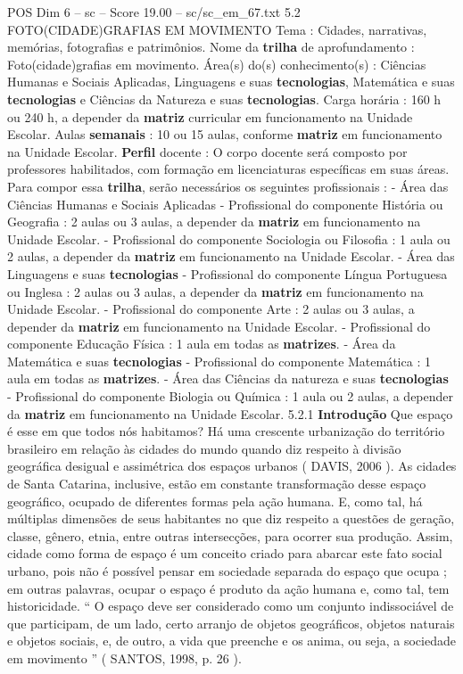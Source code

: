 \begin{textsample}{POS Dim 6 – sc – Score 19.00 – sc/sc\_em\_67.txt}  \label{ex:f6_pos_019}
5.2 FOTO(CIDADE)GRAFIAS EM MOVIMENTO Tema : Cidades, narrativas, memórias, fotografias e patrimônios.
Nome da \textbf{trilha} de aprofundamento : Foto(cidade)grafias em movimento.
Área(s) do(s) conhecimento(s) : Ciências Humanas e Sociais Aplicadas, Linguagens e suas \textbf{tecnologias}, Matemática e suas \textbf{tecnologias} e Ciências da Natureza e suas \textbf{tecnologias}.
Carga horária : 160 h ou 240 h, a depender da \textbf{matriz} curricular em funcionamento na Unidade Escolar.
Aulas \textbf{semanais} : 10 ou 15 aulas, conforme \textbf{matriz} em funcionamento na Unidade Escolar. \textbf{Perfil} docente : O corpo docente será composto por professores habilitados, com formação em licenciaturas específicas em suas áreas.
Para compor essa \textbf{trilha}, serão necessários os seguintes profissionais : - Área das Ciências Humanas e Sociais Aplicadas - Profissional do componente História ou Geografia : 2 aulas ou 3 aulas, a depender da \textbf{matriz} em funcionamento na Unidade Escolar. - Profissional do componente Sociologia ou Filosofia : 1 aula ou 2 aulas, a depender da \textbf{matriz} em funcionamento na Unidade Escolar. - Área das Linguagens e suas \textbf{tecnologias} - Profissional do componente Língua Portuguesa ou Inglesa : 2 aulas ou 3 aulas, a depender da \textbf{matriz} em funcionamento na Unidade Escolar. - Profissional do componente Arte : 2 aulas ou 3 aulas, a depender da \textbf{matriz} em funcionamento na Unidade Escolar. - Profissional do componente Educação Física : 1 aula em todas as \textbf{matrizes}. - Área da Matemática e suas \textbf{tecnologias} - Profissional do componente Matemática : 1 aula em todas as \textbf{matrizes}. - Área das Ciências da natureza e suas \textbf{tecnologias} - Profissional do componente Biologia ou Química : 1 aula ou 2 aulas, a depender da \textbf{matriz} em funcionamento na Unidade Escolar. 5.2.1 \textbf{Introdução} Que espaço é esse em que todos nós habitamos?
Há uma crescente urbanização do território brasileiro em relação às cidades do mundo quando diz respeito à divisão geográfica desigual e assimétrica dos espaços urbanos ( DAVIS, 2006 ).
As cidades de Santa Catarina, inclusive, estão em constante transformação desse espaço geográfico, ocupado de diferentes formas pela ação humana.
E, como tal, há múltiplas dimensões de seus habitantes no que diz respeito a questões de geração, classe, gênero, etnia, entre outras intersecções, para ocorrer sua produção.
Assim, cidade como forma de espaço é um conceito criado para abarcar este fato social urbano, pois não é possível pensar em sociedade separada do espaço que ocupa ; em outras palavras, ocupar o espaço é produto da ação humana e, como tal, tem historicidade. “ O espaço deve ser considerado como um conjunto indissociável de que participam, de um lado, certo arranjo de objetos geográficos, objetos naturais e objetos sociais, e, de outro, a vida que preenche e os anima, ou seja, a sociedade em movimento ” ( SANTOS, 1998, p. 26 ).

\end{textsample}
